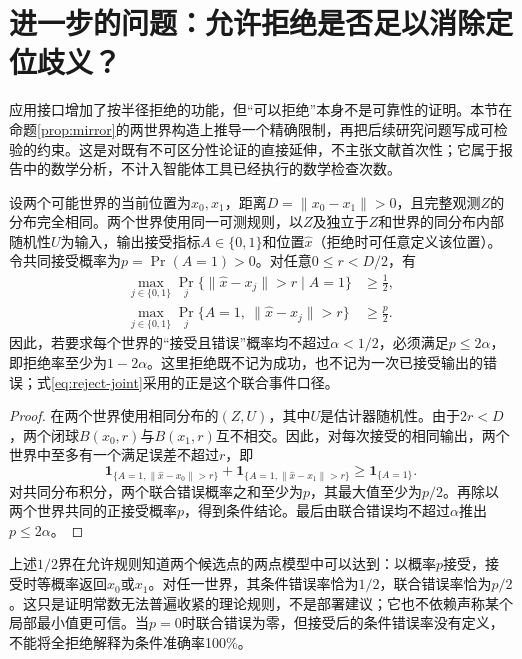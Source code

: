 \section{进一步的问题：允许拒绝是否足以消除定位歧义？}
\label{sec:rejection-question}

应用接口增加了按半径拒绝的功能，但“可以拒绝”本身不是可靠性的证明。本节在命题\ref{prop:mirror}的两世界构造上推导一个精确限制，再把后续研究问题写成可检验的约束。这是对既有不可区分性论证的直接延伸，不主张文献首次性；它属于报告中的数学分析，不计入智能体工具已经执行的数学检查次数。

\begin{proposition}[镜像歧义下的接受率与错误率限制]
\label{prop:reject-mirror}
设两个可能世界的当前位置为$x_0,x_1$，距离$D=\|x_0-x_1\|>0$，且完整观测$Z$的分布完全相同。两个世界使用同一可测规则，以$Z$及独立于$Z$和世界的同分布内部随机性$U$为输入，输出接受指标$A\in\{0,1\}$和位置$\widehat x$（拒绝时可任意定义该位置）。令共同接受概率为$p=\Pr(A=1)>0$。对任意$0\le r<D/2$，有
\begin{align}
 \max_{j\in\{0,1\}}\Pr_j\{\|\widehat x-x_j\|>r\mid A=1\}&\ge\frac12,\label{eq:reject-conditional}\\
 \max_{j\in\{0,1\}}\Pr_j\{A=1,\ \|\widehat x-x_j\|>r\}&\ge\frac p2.\label{eq:reject-joint}
\end{align}
因此，若要求每个世界的“接受且错误”概率均不超过$\alpha<1/2$，必须满足$p\le2\alpha$，即拒绝率至少为$1-2\alpha$。这里拒绝既不记为成功，也不记为一次已接受输出的错误；式\eqref{eq:reject-joint}采用的正是这个联合事件口径。
\end{proposition}

\begin{proof}
在两个世界使用相同分布的$(Z,U)$，其中$U$是估计器随机性。由于$2r<D$，两个闭球$B(x_0,r)$与$B(x_1,r)$互不相交。因此，对每次接受的相同输出，两个世界中至多有一个满足误差不超过$r$，即
\[
 \mathbf1_{\{A=1,\|\widehat x-x_0\|>r\}}+
 \mathbf1_{\{A=1,\|\widehat x-x_1\|>r\}}
 \ge \mathbf1_{\{A=1\}}.
\]
对共同分布积分，两个联合错误概率之和至少为$p$，其最大值至少为$p/2$。再除以两个世界共同的正接受概率$p$，得到条件结论。最后由联合错误均不超过$\alpha$推出$p\le2\alpha$。
\end{proof}

上述$1/2$界在允许规则知道两个候选点的两点模型中可以达到：以概率$p$接受，接受时等概率返回$x_0$或$x_1$。对任一世界，其条件错误率恰为$1/2$，联合错误率恰为$p/2$。这只是证明常数无法普遍收紧的理论规则，不是部署建议；它也不依赖声称某个局部最小值更可信。当$p=0$时联合错误为零，但接受后的条件错误率没有定义，不能将全拒绝解释为条件准确率100\%。

